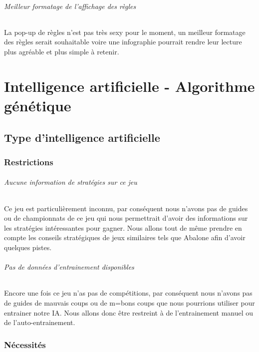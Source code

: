 \documentclass{scrreprt}
\begin{document}
			\paragraph{Meilleur formatage de l'affichage des règles}
			
			La pop-up de règles n'est pas très sexy pour le moment, un meilleur formatage des règles serait souhaitable voire une infographie pourrait rendre leur lecture plus agréable et plus simple à retenir.
				
	
\part{Intelligence artificielle - Algorithme génétique}

	\chapter{Type d'intelligence artificielle}
		\section{Restrictions}
			\paragraph{Aucune information de stratégies sur ce jeu}
			
			Ce jeu est particulièrement inconnu, par conséquent nous n'avons pas de guides ou de championnats de ce jeu qui nous permettrait d'avoir des informations sur les stratégies intéressantes pour gagner. Nous allons tout de même prendre en compte les conseils stratégiques de jeux similaires tels que Abalone afin d'avoir quelques pistes. 
			
			\paragraph{Pas de données d'entrainement disponibles}
			
			Encore une fois ce jeu n'as pas de compétitions, par conséquent nous n'avons pas de guides de mauvais coups ou de m=bons coups que nous pourrions utiliser pour entrainer notre IA. Nous allons donc être restreint à de l'entrainement manuel ou de l'auto-entrainement.
			
		\section{Nécessités}
		
\end{document}
